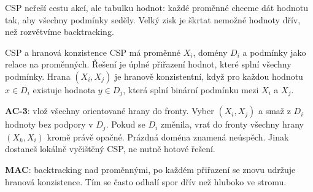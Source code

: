 \ucivo
\begin{intuice}
CSP neřeší cestu akcí, ale tabulku hodnot: každé proměnné chceme dát hodnotu tak, aby všechny podmínky seděly. Velký zisk je škrtat nemožné hodnoty dřív, než rozvětvíme backtracking.
\end{intuice}

\begin{center}
\end{center}

\begin{defbox}{CSP a hranová konzistence}
CSP má proměnné $X_i$, domény $D_i$ a podmínky jako relace na proměnných. Řešení je úplné přiřazení hodnot, které splní všechny podmínky. Hrana $(X_i,X_j)$ je hranově konzistentní, když pro každou hodnotu $x\in D_i$ existuje hodnota $y\in D_j$, která splní binární podmínku mezi $X_i$ a $X_j$.
\end{defbox}

\textbf{AC-3}: vlož všechny orientované hrany do fronty. Vyber $(X_i,X_j)$ a smaž z $D_i$ hodnoty bez podpory v $D_j$. Pokud se $D_i$ změnila, vrať do fronty všechny hrany $(X_k,X_i)$ kromě právě opačné. Prázdná doména znamená neúspěch. Jinak dostaneš lokálně vyčištěný CSP, ne nutně hotové řešení.

\textbf{MAC}: backtracking nad proměnnými, po každém přiřazení se znovu udržuje hranová konzistence. Tím se často odhalí spor dřív než hluboko ve stromu.


